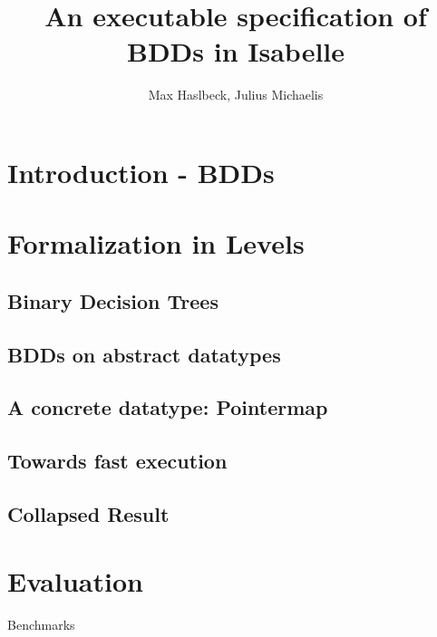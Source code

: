 \documentclass{beamer}
\title{An executable specification of BDDs in Isabelle}
\author{Max Haslbeck, Julius Michaelis}
\begin{document}
\frame{\titlepage}
\maketitleframe{}
\section{Introduction - BDDs}
\begin{frame}
\end{frame}
\section{Formalization in Levels}
\subsection{Binary Decision Trees}
\subsection{BDDs on abstract datatypes}
\subsection{A concrete datatype: Pointermap}
\subsection{Towards fast execution}
\subsection{Collapsed Result}
\begin{frame}
\end{frame}
\section{Evaluation}
\begin{frame}{Benchmarks}
\end{frame}
\end{document}
